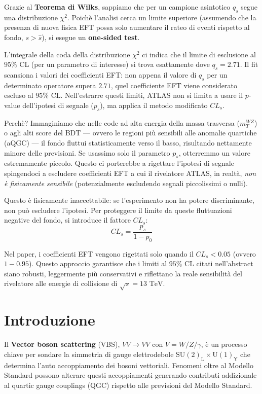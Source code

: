 \documentclass[11pt]{article}
\begin{document}
Grazie al \textbf{Teorema di Wilks}, sappiamo che per un campione asintotico $q_s$ segue una distribuzione $\chi^2$. Poichè l'analisi cerca un limite superiore (assumendo che la presenza di nuova fisica EFT possa solo aumentare il rateo di eventi rispetto al fondo, $s > \hat{s}$), si esegue un \textbf{one-sided test}. 

L'integrale della coda della distribuzione $\chi^2$ ci indica che il limite di esclusione al $95\%$ CL (per un parametro di interesse) si trova esattamente dove $q_s = 2.71$. Il fit scansiona i valori dei coefficienti EFT: non appena il valore di $q_s$ per un determinato operatore supera $2.71$, quel coefficiente EFT viene considerato escluso al $95\%$ CL.
Nell'estrarre questi limiti, ATLAS non si limita a usare il $p$-value dell'ipotesi di segnale ($p_s$), ma applica il metodo modificato \textbf{$CL_s$}. 

Perchè? Immaginiamo che nelle code ad alta energia della massa trasversa ($m_T^{WZ}$) o agli alti score del BDT --- ovvero le regioni più sensibili alle anomalie quartiche (aQGC) --- il fondo fluttui statisticamente verso il basso, risultando nettamente minore delle previsioni. Se usassimo solo il parametro $p_s$, otterremmo un valore estremamente piccolo. Questo ci porterebbe a rigettare l'ipotesi di segnale spingendoci a escludere coefficienti EFT a cui il rivelatore ATLAS, in realtà, \textit{non è fisicamente sensibile} (potenzialmente escludendo segnali piccolissimi o nulli).

Questo è fisicamente inaccettabile: se l'esperimento non ha potere discriminante, non può escludere l'ipotesi. Per proteggere il limite da queste fluttuazioni negative del fondo, si introduce il fattore $CL_s$:
\begin{equation}
CL_s = \frac{p_s}{1 - p_0}
\end{equation}

Nel paper, i coefficienti EFT vengono rigettati solo quando il $CL_s < 0.05$ (ovvero $1 - 0.95$). Questo approccio garantisce che i limiti al $95\%$ CL citati nell'abstract siano robusti, leggermente più conservativi e riflettano la reale sensibilit\`a del rivelatore alle energie di collisione di $\sqrt{s} = 13\text{ TeV}$.

\section{Introduzione}
Il \textbf{Vector boson scattering} (VBS), $VV \to VV$ con $V= W/Z/\gamma$, è un processo chiave per sondare la simmetria di gauge elettrodebole $\text{SU}(2)_{\mathrm{L}} \times \text{U}(1)_{\mathrm{Y}}$ che determina l'auto accoppiamento dei bosoni vettoriali. Fenomeni oltre al Modello Standard possono alterare questi accoppiamenti generando contributi addizionale al quartic gauge couplings (QGC) rispetto alle previsioni del Modello Standard.
\end{document}
